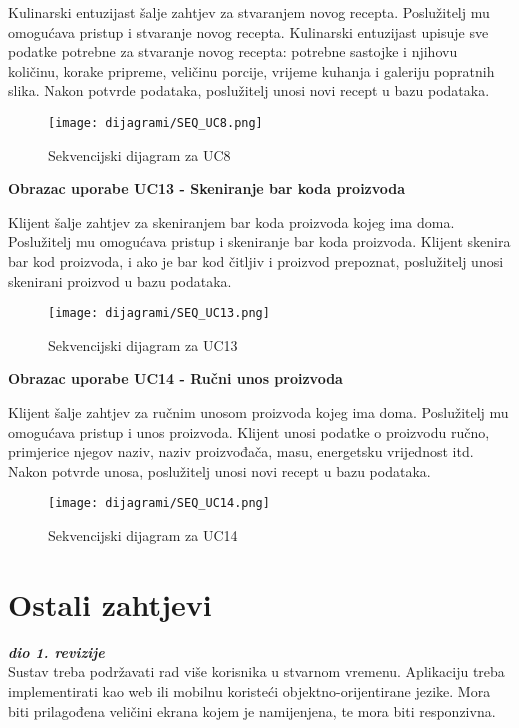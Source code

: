 				Kulinarski entuzijast šalje zahtjev za stvaranjem novog recepta. Poslužitelj mu omogućava pristup i stvaranje novog recepta. Kulinarski entuzijast upisuje sve podatke potrebne za stvaranje novog recepta: potrebne sastojke i njihovu količinu, korake pripreme, veličinu porcije, vrijeme kuhanja i galeriju popratnih slika. Nakon potvrde podataka, poslužitelj unosi novi recept u bazu podataka.
				
					
				\begin{figure}[H]
			\texttt{[image: dijagrami/SEQ\_UC8.png]} %
			\centering
			\caption{Sekvencijski dijagram za UC8}
			\label{SEQ_UC8}
		\end{figure}
				
			\begin{large}{\textbf{Obrazac uporabe UC13 - Skeniranje bar koda proizvoda}}\end{large}

			Klijent šalje zahtjev za skeniranjem bar koda proizvoda kojeg ima doma. Poslužitelj mu omogućava pristup i skeniranje bar koda proizvoda. Klijent skenira bar kod proizvoda, i ako je bar kod čitljiv i proizvod prepoznat, poslužitelj unosi skenirani proizvod u bazu podataka.
				
					
				\begin{figure}[H]
			\texttt{[image: dijagrami/SEQ\_UC13.png]} %
			\centering
			\caption{Sekvencijski dijagram za UC13}
			\label{SEQ_UC13}
		\end{figure}
				
			\begin{large}{\textbf{Obrazac uporabe UC14 - Ručni unos proizvoda}}\end{large}
			
			Klijent šalje zahtjev za ručnim unosom proizvoda kojeg ima doma. Poslužitelj mu omogućava pristup i unos proizvoda. Klijent unosi podatke o proizvodu ručno, primjerice njegov naziv, naziv proizvođača, masu, energetsku vrijednost itd. Nakon potvrde unosa, poslužitelj unosi novi recept u bazu podataka.
				
					
				\begin{figure}[H]
			\texttt{[image: dijagrami/SEQ\_UC14.png]} %
			\centering
			\caption{Sekvencijski dijagram za UC14}
			\label{SEQ_UC14}
		\end{figure}

		\section{Ostali zahtjevi}
		
			\textbf{\textit{dio 1. revizije}}\\
		 
			 Sustav treba podržavati rad više korisnika u stvarnom vremenu. Aplikaciju treba implementirati kao web ili mobilnu koristeći objektno-orijentirane jezike. Mora biti prilagođena veličini ekrana kojem je namijenjena, te mora biti responzivna. 
			 
			 
			 
	